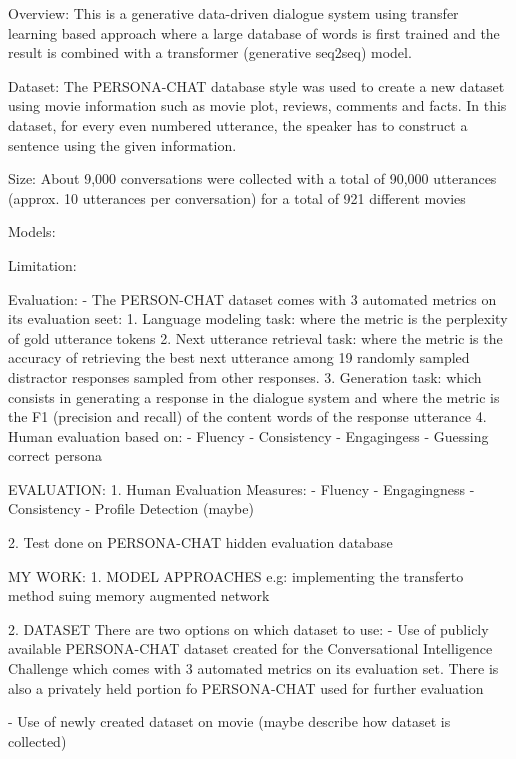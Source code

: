 Overview:
This is a generative data-driven dialogue system using transfer learning based approach where a large database of words is first trained and the result is combined with a transformer (generative seq2seq) model.


Dataset:
The PERSONA-CHAT database style was used to create a new dataset using movie information such as movie plot, reviews, comments and facts. In this dataset, for every even numbered utterance, the speaker has to construct a sentence using the given information.

Size: About 9,000 conversations were collected with a total of 90,000 utterances (approx. 10 utterances per conversation) for a total of 921 different movies

Models:


Limitation:  

Evaluation:
-  The PERSON-CHAT dataset comes with 3 automated metrics on its evaluation seet:
	1. Language modeling task: where the metric is the perplexity of gold utterance tokens
	2. Next utterance retrieval task: where the metric is the accuracy of retrieving the best next utterance among 19 randomly sampled distractor responses sampled from other responses.
	3. Generation task: which consists in generating a response in the dialogue system and where the metric is the F1 (precision and recall) of the content words of the response utterance
	4. Human evaluation based on:
		- Fluency
		- Consistency
		- Engagingess
		- Guessing correct persona



	
	
	
	
	

EVALUATION:
1. Human Evaluation Measures:
	- Fluency
	- Engagingness
	- Consistency
	- Profile Detection (maybe)

2. Test done on PERSONA-CHAT hidden evaluation database

	
MY WORK:
1. MODEL APPROACHES
	e.g: implementing the transferto method suing memory augmented network
	
2. DATASET
There are two options on which dataset to use:
- Use of publicly available PERSONA-CHAT dataset created for the Conversational Intelligence Challenge which comes with 3 automated metrics on its evaluation set.
	There is also a privately held portion fo PERSONA-CHAT used for further evaluation

- Use of newly created dataset on movie (maybe describe how dataset is collected)


